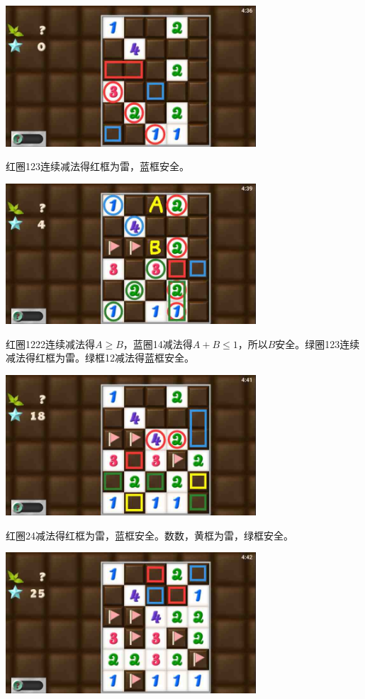 \subsection{} %
\begin{center}
    \includegraphics[width=0.7\textwidth]{puzzlelow/210-1.jpg}
\end{center}
红圈123连续减法得红框为雷，蓝框安全。
\begin{center}
    \includegraphics[width=0.7\textwidth]{puzzlelow/210-2.jpg}
\end{center}
红圈1222连续减法得$A\ge B$，蓝圈14减法得$A+B\le 1$，所以$B$安全。绿圈123连续减法得红框为雷。绿框12减法得蓝框安全。
\begin{center}
    \includegraphics[width=0.7\textwidth]{puzzlelow/210-3.jpg}
\end{center}
红圈24减法得红框为雷，蓝框安全。数数，黄框为雷，绿框安全。
\begin{center}
    \includegraphics[width=0.7\textwidth]{puzzlelow/210-4.jpg}
\end{center}
